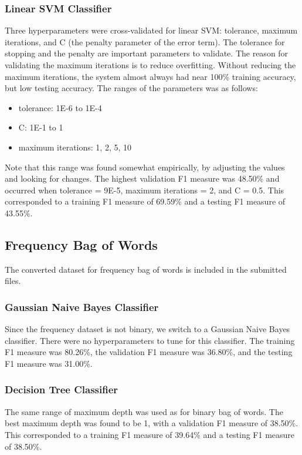 \documentclass[11pt]{article}
\begin{document}
\subsubsection{Linear SVM Classifier}
Three hyperparameters were cross-validated for linear SVM: tolerance, maximum iterations, and C (the penalty parameter of the error term). The tolerance for stopping and the penalty are important parameters to validate. The reason for validating the maximum iterations is to reduce overfitting. Without reducing the maximum iterations, the system almost always had near 100\% training accuracy, but low testing accuracy. The ranges of the parameters was as follows:
\begin{itemize}
\item tolerance: 1E-6 to 1E-4
\item C: 1E-1 to 1
\item maximum iterations: {1, 2, 5, 10}
\end{itemize}
Note that this range was found somewhat empirically, by adjusting the values and looking for changes. The highest validation F1 measure was 48.50\% and occurred when tolerance = 9E-5, maximum iterations = 2, and C = 0.5. This corresponded to a training F1 measure of 69.59\% and a testing F1 measure of 43.55\%. 

\subsection{Frequency Bag of Words}
The converted dataset for frequency bag of words is included in the submitted files.

\subsubsection{Gaussian Naive Bayes Classifier}
Since the frequency dataset is not binary, we switch to a Gaussian Naive Bayes classifier. There were no hyperparameters to tune for this classifier. The training F1 measure was 80.26\%, the validation F1 measure was 36.80\%, and the testing F1 measure was 31.00\%. 

\subsubsection{Decision Tree Classifier}
The same range of maximum depth was used as for binary bag of words. The best maximum depth was found to be 1, with a validation F1 measure of 38.50\%. This corresponded to a training F1 measure of 39.64\% and a testing F1 measure of 38.50\%.
\end{document}
